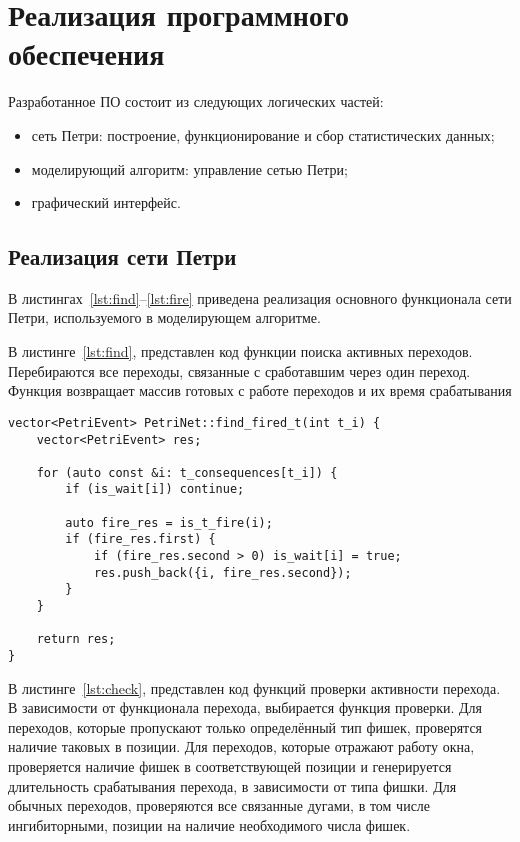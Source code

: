 \FloatBarrier

\section{Реализация программного обеспечения}

Разработанное ПО состоит из следующих логических частей:
\begin{itemize}[label=---]
	\item сеть Петри: построение, функционирование и сбор статистических данных;
	\item моделирующий алгоритм: управление сетью Петри;
	\item графический интерфейс.
\end{itemize}

\subsection{Реализация сети Петри}

В листингах~\ref{lst:find}--\ref{lst:fire} приведена реализация основного функционала сети Петри, используемого в моделирующем алгоритме.

В листинге~\ref{lst:find}, представлен код функции поиска активных переходов. Перебираются все переходы, связанные с сработавшим через один переход. Функция возвращает массив готовых с работе переходов и их время срабатывания

\begin{center}
	\captionsetup{justification=raggedright,singlelinecheck=off}
	\begin{lstlisting}[label=lst:find,caption=Функция поиска активного перехода ,showstringspaces=false]
vector<PetriEvent> PetriNet::find_fired_t(int t_i) {
	vector<PetriEvent> res;
	
	for (auto const &i: t_consequences[t_i]) {
		if (is_wait[i]) continue;
		
		auto fire_res = is_t_fire(i);
		if (fire_res.first) {
			if (fire_res.second > 0) is_wait[i] = true;
			res.push_back({i, fire_res.second});
		}
	}
	
	return res;
}
	\end{lstlisting}
\end{center}
\FloatBarrier

В листинге~\ref{lst:check}, представлен код функций проверки активности перехода. В зависимости от функционала перехода, выбирается функция проверки. Для переходов, которые пропускают только определённый тип фишек, проверятся наличие таковых в позиции. Для переходов, которые отражают работу окна, проверяется наличие фишек в соответствующей позиции и генерируется длительность срабатывания перехода, в зависимости от типа фишки. Для обычных переходов, проверяются все связанные дугами, в том числе ингибиторными, позиции на наличие необходимого числа фишек.

